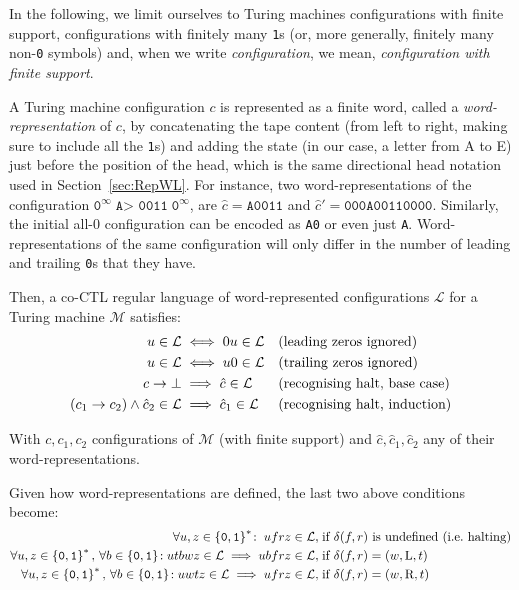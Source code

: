 In the following, we limit ourselves to Turing machines configurations with finite support, \ie configurations with finitely many \texttt{1}s (or, more generally, finitely many non-\texttt{0} symbols) and, when we write \textit{configuration}, we mean, \textit{configuration with finite support}.

A Turing machine configuration $c$ is represented as a finite word, called a \textit{word-representation} of $c$, by concatenating the tape content (from left to right, making sure to include all the \texttt{1}s) and adding the state (in our case, a letter from A to E) just before the position of the head, which is the same directional head notation used in Section~\ref{sec:RepWL}. For instance, two word-representations of the configuration $\texttt{0}^\infty \; \texttt{A> 0011} \; \texttt{0}^\infty$, are $\hat{c} = \texttt{A0011}$ and $\hat{c}' = \texttt{000A00110000}$. Similarly, the initial all-0 configuration can be encoded as \texttt{A0} or even just \texttt{A}. Word-representations of the same configuration will only differ in the number of leading and trailing \texttt{0}s that they have.


Then, a co-CTL regular language of word-represented configurations $\mathcal{L}$ for a Turing machine $\mathcal{M}$ satisfies:
\begin{align}
    u \in \mathcal{L}                               & \iff 0u \in \mathcal{L}           &  & \text{(leading zeros ignored)}
    \label{eq:lzignore}
    \\
    u \in \mathcal{L}                               & \iff u0 \in \mathcal{L}           &  & \text{(trailing zeros ignored)}
    \label{eq:tzignore}
    \\
    c\to\bot                                    & \implies \hat{c} \in \mathcal{L}  &  & \text{(recognising halt, base case)} \nonumber \\
    (c_1\to c_2)\land \hat{c}_2 \in \mathcal{L} & \implies\hat{c}_1 \in \mathcal{L} &  & \text{(recognising halt, induction)} \nonumber
\end{align}


With $c, c_1, c_2$ configurations of $\mathcal{M}$ (with finite support) and $\hat{c}, \hat{c}_1, \hat{c}_2$ any of their word-representations.


Given how word-representations are defined, the last two above conditions become:
\begin{align}
    \forall u,z\in\left\{\texttt{0},\texttt{1}\right\}^*\!: \; ufrz \in \mathcal{L},\;                                                             & \text{if $\delta(f,r)$ is undefined (i.e.~halting)} \label{eq:h0}
    \\
    \forall u,z\in\left\{\texttt{0},\texttt{1}\right\}^*,\,\forall b \in \left\{\texttt{0},\texttt{1}\right\}\!: utbwz \in \mathcal{L} \implies ubfrz \in \mathcal{L},\;     & \text{if $\delta(f,r) = (w,\text{L},t)$} \label{eq:hnl}
    \\
    \forall u,z\in\left\{\texttt{0},\texttt{1}\right\}^*,\,\forall b \in \left\{\texttt{0},\texttt{1}\right\}\!: u w t z \in \mathcal{L} \implies u f r z \in \mathcal{L},\; & \text{if $\delta(f,r) = (w,\text{R},t)$} \label{eq:hnr}
\end{align}

